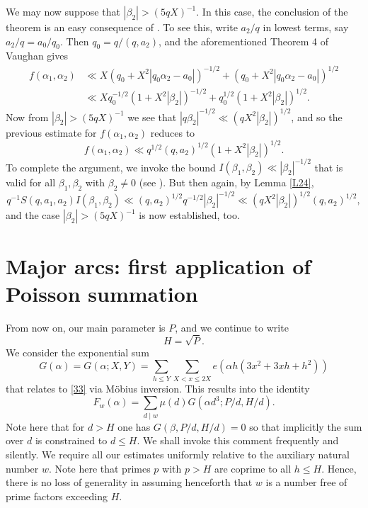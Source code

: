\documentclass[reqno]{amsart}
\numberwithin{equation}{section}
\begin{document}
We may now suppose that $|\beta_2|> (5qX)^{-1}$. In this case, the conclusion of the theorem is an easy consequence of \cite[Theorem 4]{gen}. To see this, write
$a_2/q$ in lowest terms, say $a_2/q=a_0/q_0$. Then $q_0=q/(q,a_2)$, and the aforementioned Theorem 4 of Vaughan \cite{gen} gives
\begin{align*} f(\alpha_1,\alpha_2)& \ll X(q_0 +X^2|q_0\alpha_2-a_0|)^{-1/2}
+ (q_0+X^2|q_0\alpha_2-a_0|)^{1/2}\\
& \ll Xq_0^{-1/2} (1+X^2|\beta_2|)^{-1/2} + q_0^{1/2} (1+X^2|\beta_2|)^{1/2}.
\end{align*}
Now from $|\beta_2|> (5qX)^{-1}$ we see that $|q\beta_2|^{-1/2} \ll (qX^2|\beta_2|)^{1/2}$, and so the previous estimate for $f(\alpha_1,\alpha_2)$ reduces to
$$ f(\alpha_1,\alpha_2) \ll q^{1/2}(q,a_2)^{1/2} (1+X^2|\beta_2|)^{1/2}. $$
To complete the argument, we invoke the bound $I(\beta_1,\beta_2)\ll |\beta_2|^{-1/2}$ that is valid for all $\beta_1,\beta_2$ with $\beta_2\neq 0$ (see \cite[Lemma 2.2]{gen}). But then again, by Lemma \ref{L24},
$$ q^{-1}S(q,a_1,a_2)I(\beta_1,\beta_2) \ll (q,a_2)^{1/2} q^{-1/2} |\beta_2|^{-1/2}
\ll (qX^2|\beta_2|)^{1/2} (q,a_2)^{1/2}, $$
and the case $|\beta_2|> (5qX)^{-1}$ is now established, too. 

\section{Major arcs: first application of Poisson summation}
From now on, our main parameter is $P$, and we continue to write
$$ H= \sqrt P. $$
We consider the exponential sum 
\begin{equation}\label{35} G(\alpha)=G(\alpha;X,Y)= \sum_{h\le Y}\sum_{X<x\le 2X} e(\alpha  h(3x^2+3xh +h^2))\end{equation}
that relates to \eqref{33} via 
 M\"obius inversion. This results into the identity
\begin{equation}\label{36} F_w(\alpha) = \sum_{d\mid w} \mu(d) G(\alpha d^3; P/d,H/d). \end{equation}
Note here that for $d>H$ one has $G(\beta,P/d,H/d)=0$ so that implicitly the sum over $d$ is constrained to $d\le H$. We shall invoke this comment frequently and silently. We require all our estimates uniformly relative to the auxiliary natural number $w$. 
Note here that primes $p$ with $p>H$ are coprime to all $h\le H$. Hence, there is no loss of generality in assuming henceforth that $w$ is a number free of prime factors exceeding $H$.
\end{document}
